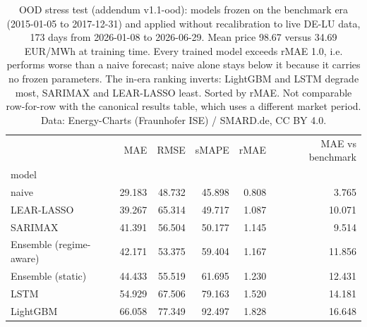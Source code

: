 \begin{table}[htbp]
\caption{OOD stress test (addendum v1.1-ood): models frozen on the benchmark era (2015-01-05 to 2017-12-31) and applied without recalibration to live DE-LU data, 173 days from 2026-01-08 to 2026-06-29. Mean price 98.67 versus 34.69 EUR/MWh at training time. Every trained model exceeds rMAE 1.0, i.e. performs worse than a naive forecast; naive alone stays below it because it carries no frozen parameters. The in-era ranking inverts: LightGBM and LSTM degrade most, SARIMAX and LEAR-LASSO least. Sorted by rMAE. Not comparable row-for-row with the canonical results table, which uses a different market period. Data: Energy-Charts (Fraunhofer ISE) / SMARD.de, CC BY 4.0.}
\label{tab:ood-stress}
\begin{tabular}{lrrrrr}
\toprule
 & MAE & RMSE & sMAPE & rMAE & MAE vs benchmark \\
model &  &  &  &  &  \\
\midrule
naive & 29.183 & 48.732 & 45.898 & 0.808 & 3.765 \\
LEAR-LASSO & 39.267 & 65.314 & 49.717 & 1.087 & 10.071 \\
SARIMAX & 41.391 & 56.504 & 50.177 & 1.145 & 9.514 \\
Ensemble (regime-aware) & 42.171 & 53.375 & 59.404 & 1.167 & 11.856 \\
Ensemble (static) & 44.433 & 55.519 & 61.695 & 1.230 & 12.431 \\
LSTM & 54.929 & 67.506 & 79.163 & 1.520 & 14.181 \\
LightGBM & 66.058 & 77.349 & 92.497 & 1.828 & 16.648 \\
\bottomrule
\end{tabular}
\end{table}
